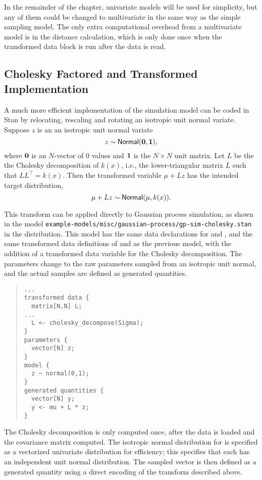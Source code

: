 In the remainder of the chapter, univariate models will be used for
simplicity, but any of them could be changed to multivariate in the
same way as the simple sampling model.  The only extra computational
overhead from a multivariate model is in the distance calculation,
which is only done once when the transformed data block is run after
the data is read.

\subsection{Cholesky Factored and Transformed Implementation}

A much more efficient implementation of the simulation model can be
coded in Stan by relocating, rescaling and rotating an isotropic unit
normal variate.  Suppose $z$ is an an isotropic unit normal variate
\[
z \sim \mbox{\sf Normal}({\bf 0}, {\bf 1}),
\]
where ${\bf 0}$ is an $N$-vector of 0 values and ${\bf 1}$ is the $N
\times N$ unit matrix.  Let $L$ be the the Cholesky decomposition of
$k(x)$, i.e., the lower-triangular matrix $L$ such that $LL^{\top} =
k(x)$.  Then the transformed variable $\mu + Lz$ has the intended
target distribution,
\[
\mu + Lz \sim \mbox{\sf Normal}(\mu,k(x)).
\]

This transform can be applied directly to Gaussian process simulation,
as shown in the model
\nolinkurl{example-models/misc/gaussian-process/gp-sim-cholesky.stan} in
the distribution.  This model has the same data declarations for
 and , and the same transformed data definitions of
 and  as the previous model, with the addition of
a transformed data variable for the Cholesky decomposition.  The
parameters change to the raw parameters sampled from an isotropic unit
normal, and the actual samples are defined as generated quantities.
%
\begin{quote}
\begin{Verbatim}[fontsize=\small]
...
transformed data {
  matrix[N,N] L;
...
  L <- cholesky_decompose(Sigma);
}
parameters {
  vector[N] z;
}
model {
  z ~ normal(0,1);
}
generated quantities {
  vector[N] y;
  y <- mu + L * z;
}
\end{Verbatim}
\end{quote}
%
The Cholesky decomposition is only computed once, after the data is
loaded and the covariance matrix  computed.  The isotropic
normal distribution for  is specified as a vectorized
univariate distribution for efficiency; this specifies that each
 has an independent unit normal distribution.  The sampled
vector  is then defined as a generated quantity using a direct
encoding of the transform described above.


